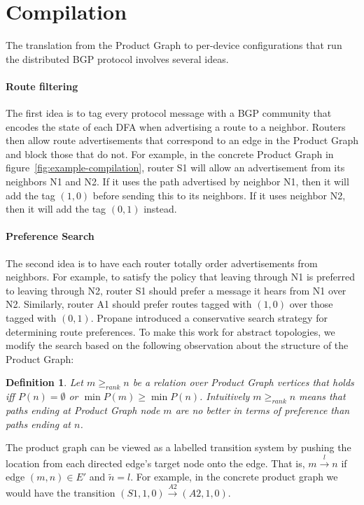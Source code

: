 \documentclass[numbers, 10pt, preprint]{sigplanconf}
\newcommand{\para}[1]{\paragraph*{\textbf{#1}}}
\newtheorem{defn}{Definition}
\begin{document}
\section{Compilation}

The translation from the Product Graph to per-device configurations that run the distributed BGP protocol involves several ideas.

\para{Route filtering}

The first idea is to tag every protocol message with a BGP community that encodes the state of each DFA when advertising a route to a neighbor. Routers then allow route advertisements that correspond to an edge in the Product Graph and block those that do not.
For example, in the concrete Product Graph in figure~\ref{fig:example-compilation}, router S1 will allow an advertisement from its neighbors N1 and N2. If it uses the path advertised by neighbor N1, then it will add the tag $(1,0)$ before sending this to its neighbors. If it uses neighbor N2, then it will add the tag $(0,1)$ instead.


\para{Preference Search}
The second idea is to have each router totally order advertisements from neighbors. For example, to satisfy the policy that leaving through N1 is preferred to leaving through N2, router S1 should prefer a message it hears from N1 over N2. Similarly, router A1 should prefer routes tagged with $(1,0)$ over those tagged with $(0,1)$.
Propane introduced a conservative search strategy for determining route preferences. To make this work for abstract topologies, we modify the search based on the following observation about the structure of the Product Graph:

\begin{defn}
Let $m \geq_{rank} n$ be a relation over Product Graph vertices that holds iff $P(n) = \emptyset$ or $\min P(m) \geq \min P(n)$. Intuitively $m \geq_{rank} n$ means that paths ending at Product Graph node $m$ are no better in terms of preference than paths ending at $n$.
%
\end{defn}
\noindent
%

The product graph can be viewed as a labelled transition system by pushing the location from each directed edge's target node onto the edge. That is, $m\overset{l}{\rightarrow}n$ if edge $(m,n) \in E'$ and $\tilde{n} = l$.
%
For example, in the concrete product graph we would have the transition $(S1,1,0)\overset{A2}{\rightarrow}(A2,1,0)$.
\end{document}
